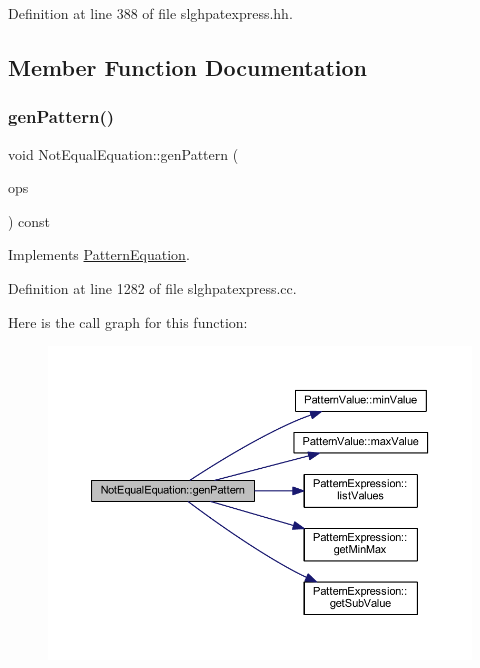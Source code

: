 Definition at line 388 of file slghpatexpress.\+hh.



\subsection{Member Function Documentation}
\mbox{\label{class_not_equal_equation_a9c356f48a2e47ea80c215b97d0b1fc65}} 
\subsubsection{\texorpdfstring{genPattern()}{genPattern()}}
{\footnotesize\ttfamily void Not\+Equal\+Equation\+::gen\+Pattern (\begin{DoxyParamCaption}\item[{const vector$<$ \mbox{\hyperlink{class_token_pattern}{Token\+Pattern}} $>$ \&}]{ops }\end{DoxyParamCaption}) const\hspace{0.3cm}{\ttfamily [virtual]}}



Implements \mbox{\hyperlink{class_pattern_equation_a9838e5bfe5b6013c99567628a6364bfd}{Pattern\+Equation}}.



Definition at line 1282 of file slghpatexpress.\+cc.

Here is the call graph for this function\+:
\nopagebreak
\begin{figure}[H]
\begin{center}
\leavevmode
\includegraphics[width=350pt]{class_not_equal_equation_a9c356f48a2e47ea80c215b97d0b1fc65_cgraph}
\end{center}
\end{figure}


